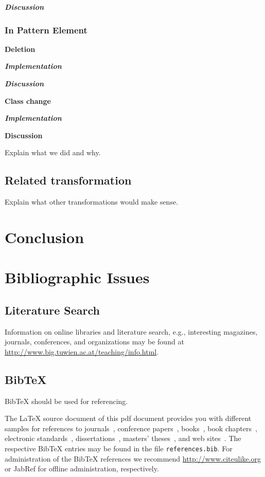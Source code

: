 \documentclass{llncs}
\begin{document}
\textbf\textit{{Discussion}}

\subsubsection{In Pattern Element}

\textbf{Deletion}

\textbf\textit{{Implementation}}

\textbf\textit{{Discussion}}

\textbf{Class change}

\textbf\textit{{Implementation}}

\textbf{Discussion}

Explain what we did and why.

\subsection{Related transformation}

Explain what other transformations would make sense.

\section{Conclusion}

\section{Bibliographic Issues}

\subsection{Literature Search}

Information on online libraries and literature search, e.g., interesting magazines, journals, conferences, and organizations may be found at \url{http://www.big.tuwien.ac.at/teaching/info.html}.

\subsection{BibTeX}

BibTeX should be used for referencing.

The LaTeX source document of this pdf document provides you with different samples for references to journals~\cite{jour:B2BServices}, conference papers~\cite{proc:TheWebMLApproach}, books~\cite{book:umlatwork}, book chapters~\cite{incoll:ErhardKonrad1992}, electronic standards~\cite{man:BPEL}, dissertations~\cite{phdthesis:manuelWimmer}, masters' theses~\cite{mast:AUMLProfile}, and web sites~\cite{misc:BIGWebsite}. The respective BibTeX entries may be found in the file \texttt{references.bib}. For administration of the BibTeX references we recommend \url{http://www.citeulike.org} or JabRef for offline administration, respectively.



\end{document}

